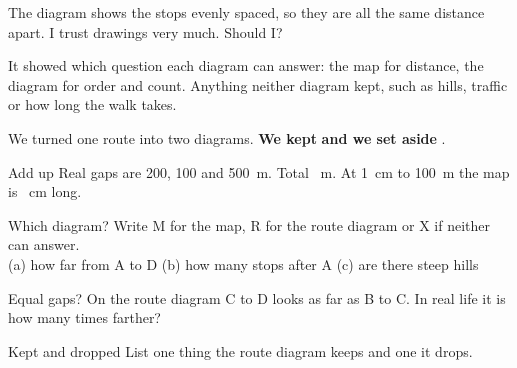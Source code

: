\begin{center}
\end{center}

\begin{multix}[hmm]\multixbot[hmm]\tcblower
The diagram shows the stops evenly spaced, so they are all the same distance apart. I trust drawings very much. Should I?
\end{multix}

{It showed which question each diagram can answer: the map for distance, the diagram for order and count.}
{Anything neither diagram kept, such as hills, traffic or how long the walk takes.}

\begin{keepbox}
We turned one route into two diagrams. \textbf{We kept} \wline[3.4cm] \textbf{and we set aside} \wline[3.4cm].
\end{keepbox}

\clearpage

\begin{puzzle}{Add up}
Real gaps are 200, 100 and 500~m. Total \wline[1.6cm]~m. At 1~cm to 100~m the map is \wline[1.6cm]~cm long.
\end{puzzle}

\begin{puzzle}{Which diagram?}
Write M for the map, R for the route diagram or X if neither can answer.\\
(a) how far from A to D \wline[1cm] \quad (b) how many stops after A \wline[1cm] \quad (c) are there steep hills \wline[1cm]
\end{puzzle}

\begin{puzzle}{Equal gaps?}
On the route diagram C to D looks as far as B to C. In real life it is how many times farther? \wline[1.6cm]
\end{puzzle}

\begin{puzzle}{Kept and dropped}
List one thing the route diagram keeps and one it drops. \wline[6cm]
\end{puzzle}

